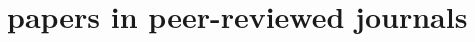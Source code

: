 \documentclass[10pt]{article}
\begin{document}



\section{papers in peer-reviewed journals}


\end{document}
